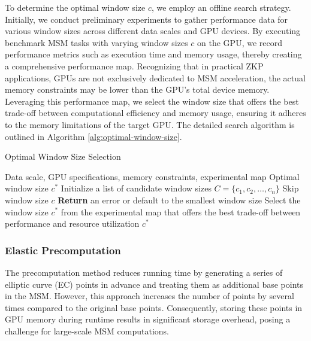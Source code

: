 \documentclass[conference]{IEEEtran}
\begin{document}
To determine the optimal window size \( c \), we employ an offline search strategy. Initially, we conduct preliminary experiments to gather performance data for various window sizes across different data scales and GPU devices. By executing benchmark MSM tasks with varying window sizes \( c \) on the GPU, we record performance metrics such as execution time and memory usage, thereby creating a comprehensive performance map. Recognizing that in practical ZKP applications, GPUs are not exclusively dedicated to MSM acceleration, the actual memory constraints may be lower than the GPU's total device memory. Leveraging this performance map, we select the window size that offers the best trade-off between computational efficiency and memory usage, ensuring it adheres to the memory limitations of the target GPU. The detailed search algorithm is outlined in Algorithm \ref{alg:optimal-window-size}.
\begin{algorithm}
    \caption{Optimal Window Size Selection}
    \label{alg:optimal-window-size}
    \begin{algorithmic}[1]
    \REQUIRE Data scale, GPU specifications, memory constraints, experimental map
    \ENSURE Optimal window size \( c^* \)
    \STATE Initialize a list of candidate window sizes \( C = \{c_1, c_2, \ldots, c_n\} \)
            \STATE Skip window size \( c \)
        \ENDIF
    \ENDFOR
        \STATE \textbf{Return} an error or default to the smallest window size
    \ELSE
        \STATE Select the window size \( c^* \) from the experimental map that offers the best trade-off between performance and resource utilization
    \ENDIF
    \RETURN \( c^* \)
    \end{algorithmic}
\end{algorithm}

\subsubsection{\textbf{Elastic Precomputation}}
The precomputation method reduces running time by generating a series of elliptic curve (EC) points in advance and treating them as additional base points in the MSM. However, this approach increases the number of points by several times compared to the original base points. Consequently, storing these points in GPU memory during runtime results in significant storage overhead, posing a challenge for large-scale MSM computations.
\end{document}
